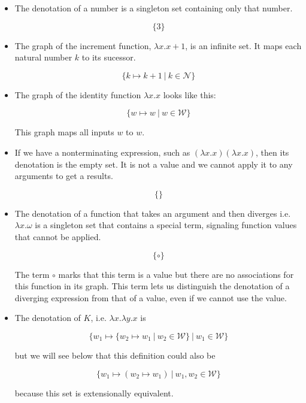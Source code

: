 \documentclass{article}
\theoremstyle{definition}
\begin{document}
\begin{itemize}

\item The denotation of a number is a singleton set containing only that
  number.

  \[  \{ 3 \} \]

\item The graph of the increment function, $\lambda x. x+1$, is an infinite set. It
maps each natural number $k$ to its sucessor.

\[ \{ k \mapsto k+1\ |\ k \in \mathcal{N} \} \]

\item The graph of the identity function $\lambda x.x$ looks like this:

\[ \{ w \mapsto w\ |\ w \in \mathcal{W} \} \]

This graph maps all inputs $w$ to $w$. 

\item If we have a nonterminating expression, such as  
  $(\lambda x.x)(\lambda x.x)$,
  then its denotation is the empty set.  It is not
  a value and we cannot apply it to any arguments to get a results.

   \[ \{\} \]

\item The denotation of a function that takes an argument and then diverges
  i.e. $\lambda x. \omega$ is a singleton set that contains a special term,
  signaling function values that cannot be applied.

  \[ \{ \circ \} \]

  The term $\circ$ marks that this term is a value but there are no
  associations for this function in its graph. This term lets us distinguish
  the denotation of a diverging expression from that of a value, even if we
  cannot use the value.

\item The denotation of $K$, i.e. $\lambda x.\lambda y.x$ is  

  \[ \{ w_1 \mapsto \{ w_2 \mapsto w_1\ |\ w_2 \in \mathcal{W} \}\ |\ w_1 \in \mathcal{W} \} \]

\noindent but we will see below that this definition could also be 

  \[ \{ w_1 \mapsto (w_2 \mapsto w_1)\ |\ w_1, w_2 \in \mathcal{W} \} \]

because this set is extensionally equivalent. 

\end{itemize}
\end{document}
